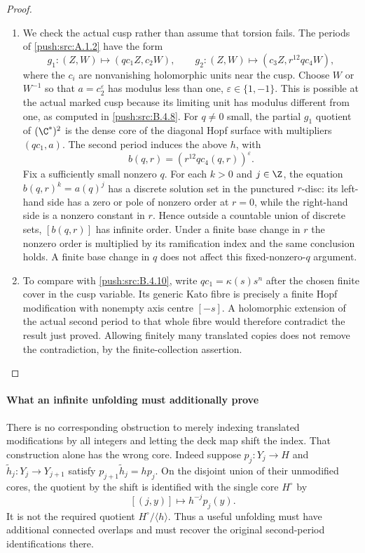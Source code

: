 \begin{proof}
\begin{enumerate}[label=\arabic*.,leftmargin=*]
\item We check the actual cusp rather than assume that torsion fails.
The periods of \ref{push:src:A.1.2} have the form
\[
 g_1:(Z,W)\longmapsto(q c_1 Z,c_2W),\qquad
 g_2:(Z,W)\longmapsto(c_3Z,r^{12}q c_4 W),
\]
where the $c_i$ are nonvanishing holomorphic units near the cusp.
Choose $W$ or $W^{-1}$ so that
$a=c_2^{\varepsilon}$ has modulus less than one,
$\varepsilon\in\{1,-1\}$.
This is possible at the actual marked cusp because its limiting
unit has modulus different from one, as computed in \ref{push:src:B.4.8}.
For $q\ne0$ small, the partial $g_1$ quotient of $(\C^*)^2$
is the dense core of the diagonal Hopf surface with multipliers
$(q c_1,a)$. The second period induces the above $h$, with
\[
 b(q,r)=(r^{12}q c_4(q,r))^{\varepsilon}.
\]
Fix a sufficiently small nonzero $q$. For each $k>0$ and
$j\in\Z$, the equation $b(q,r)^k=a(q)^j$ has a discrete
solution set in the punctured $r$-disc: its left-hand side has
a zero or pole of nonzero order at $r=0$, while the right-hand
side is a nonzero constant in $r$.
Hence outside a countable union of discrete sets, $[b(q,r)]$
has infinite order. Under a finite base change in $r$ the
nonzero order is multiplied by its ramification index and
the same conclusion holds. A finite base change in $q$ does
not affect this fixed-nonzero-$q$ argument.

\item To compare with \ref{push:src:B.4.10}, write $q c_1=\kappa(s)s^n$ after
the chosen finite cover in the cusp variable. Its generic Kato
fibre is precisely a finite Hopf modification with nonempty
axis centre $[-s]$. A holomorphic extension of the actual second
period to that whole fibre would therefore contradict the result
just proved. Allowing finitely many translated copies does not
remove the contradiction, by the finite-collection assertion.
\end{enumerate}
\end{proof}


\paragraph{What an infinite unfolding must additionally prove}
There is no corresponding obstruction to merely indexing translated
modifications by all integers and letting the deck map shift the
index. That construction alone has the wrong core. Indeed suppose
$p_j:Y_j\to H$ and
$\widetilde h_j:Y_j\to Y_{j+1}$ satisfy
$p_{j+1}\widetilde h_j=hp_j$.
On the disjoint union of their unmodified cores, the quotient by
the shift is identified with the single core $H^\circ$ by
\[
 [(j,y)]\longmapsto h^{-j}p_j(y).
\]
It is not the required quotient $H^\circ/\langle h\rangle$.
Thus a useful unfolding must have additional connected overlaps
and must recover the original second-period identifications there.

